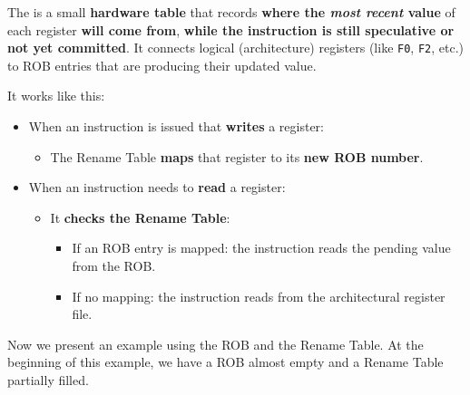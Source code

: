 \begin{examplebox}
    The  is a small \textbf{hardware table} that records \textbf{where the \emph{most recent} value} of each register \textbf{will come from}, \textbf{while the instruction is still speculative or not yet committed}. It connects logical (architecture) registers (like \texttt{F0}, \texttt{F2}, etc.) to ROB entries that are producing their updated value.

    \highspace
    It works like this:
    \begin{itemize}
        \item When an instruction is issued that \textbf{writes} a register:
        \begin{itemize}
            \item The Rename Table \textbf{maps} that register to its \textbf{new ROB number}.
        \end{itemize}
        \item When an instruction needs to \textbf{read} a register:
        \begin{itemize}
            \item It \textbf{checks the Rename Table}:
            \begin{itemize}
                \item If an ROB entry is mapped: the instruction reads the pending value from the ROB.
                \item If no mapping: the instruction reads from the architectural register file.
            \end{itemize}
        \end{itemize}
    \end{itemize}

    \highspace
    Now we present an example using the ROB and the Rename Table. At the beginning of this example, we have a ROB almost empty and a Rename Table partially filled.

    \newpage


\end{examplebox}
